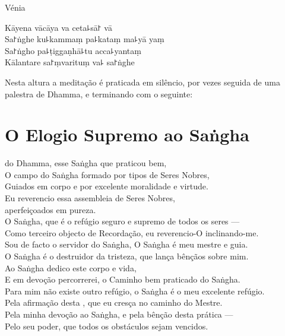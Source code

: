\enlargethispage{\baselineskip}

\vfill

\begin{instruction}
  Vénia
\end{instruction}

Kāyena vācāya va ceta꜕sā꜓ vā\\
Sa꜓ṅghe ku꜕kammaṃ pa꜕kataṃ ma꜕yā yaṃ\\
Sa꜓ṅgho pa꜕ṭiggaṇhā꜕tu acca꜕yantaṃ\\
Kālantare sa꜓ṃvarituṃ va꜕ sa꜓ṅghe

\vfill

\begin{instruction}
  Nesta altura a meditação é praticada em silêncio, por vezes seguida de uma palestra de Dhamma, e terminando com o seguinte:
\end{instruction}

\clearpage

\nextChapterUseDelegatedPageNumber

\chapter{O Elogio Supremo ao Saṅgha}

\begin{leader}
\end{leader}

 do Dhamma, esse Saṅgha que praticou bem,\\
O campo do Saṅgha formado por  tipos de Seres Nobres,\\
Guiados em corpo e  por excelente moralidade e virtude.\\
Eu reverencio essa assembleia de Seres Nobres,\\
\vin aperfeiçoados em pureza.\\
O Saṅgha, que é o refúgio seguro e supremo de todos os seres ---\\
Como terceiro objecto de Recordação, eu reverencio-O inclinando-me.\\
Sou de facto o servidor do Saṅgha, O Saṅgha é meu mestre e guia.\\
O Saṅgha é o destruidor da tristeza, que lança bênçãos sobre mim.\\
Ao Saṅgha dedico este corpo e vida,\\
E em devoção percorrerei, o Caminho bem praticado do Saṅgha.\\
Para mim não existe outro refúgio, o Saṅgha é o meu excelente refúgio.\\
Pela afirmação desta , que eu cresça no caminho do Mestre.\\
Pela minha devoção ao Saṅgha, e pela bênção desta prática ---\\
Pelo seu poder, que todos os obstáculos sejam vencidos.

